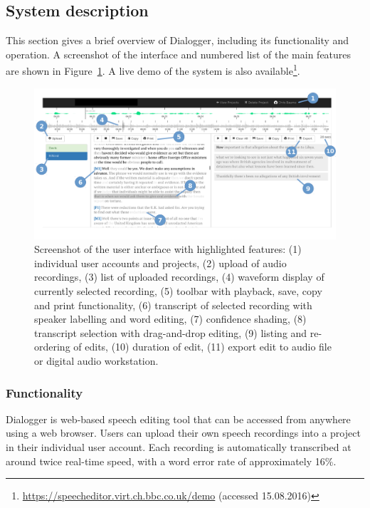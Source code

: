 
\subsection{System description}
This section gives a brief overview of Dialogger, including its functionality
and operation.  A screenshot of the interface and numbered list of the main
features are shown in Figure~\ref{fig:interface}.  A live demo of the system
is also available\footnote{\url{https://speecheditor.virt.ch.bbc.co.uk/demo}
  (accessed 15.08.2016)}.

\begin{figure}[ht]
\centering
  \includegraphics[width=\columnwidth]{figs/interface-labels.pdf}
  \caption{Screenshot of the user interface with highlighted features: (1)
    individual user accounts and projects, (2) upload of audio recordings, (3)
    list of uploaded recordings, (4) waveform display of currently selected
    recording, (5) toolbar with playback, save, copy and print functionality,
    (6) transcript of selected recording with speaker labelling and word
    editing, (7) confidence shading, (8) transcript selection with
    drag-and-drop editing, (9) listing and re-ordering of edits, (10) duration
    of edit, (11) export edit to audio file or digital audio workstation.}
  \label{fig:interface}
\end{figure}

\subsubsection{Functionality}
Dialogger is web-based speech editing tool that can be accessed from anywhere
using a web browser.
Users can upload their own speech recordings into a project in their individual user
account. Each recording is automatically transcribed at around twice
real-time speed, with a word error rate of approximately 16\%.

